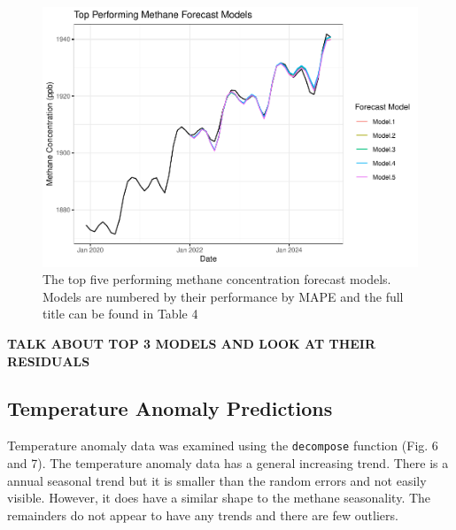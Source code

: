 \documentclass[
]{article}
\begin{document}
\begin{figure}
\centering
\includegraphics{Final_Report_files/figure-latex/unnamed-chunk-11-1.pdf}
\caption{The top five performing methane concentration forecast models.
Models are numbered by their performance by MAPE and the full title can
be found in Table 4}
\end{figure}

\textbf{TALK ABOUT TOP 3 MODELS AND LOOK AT THEIR RESIDUALS}

\newpage

\subsection{Temperature Anomaly
Predictions}\label{temperature-anomaly-predictions}

Temperature anomaly data was examined using the \texttt{decompose}
function (Fig. 6 and 7). The temperature anomaly data has a general
increasing trend. There is a annual seasonal trend but it is smaller
than the random errors and not easily visible. However, it does have a
similar shape to the methane seasonality. The remainders do not appear
to have any trends and there are few outliers.
\end{document}
